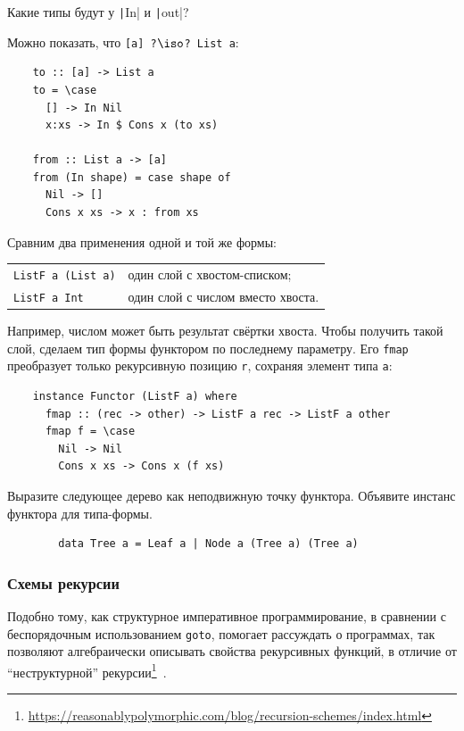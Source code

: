 \begin{task}
    Какие типы будут у \texttt|In| и \texttt|out|?
\end{task}

Можно показать, что \texttt{[a] ?$\iso$? List a}:
\begin{verbatim}
    to :: [a] -> List a
    to = \case
      [] -> In Nil
      x:xs -> In $ Cons x (to xs)

    from :: List a -> [a]
    from (In shape) = case shape of
      Nil -> []
      Cons x xs -> x : from xs
\end{verbatim}

Сравним два применения одной и той же формы:
\begin{center}
    \begin{tabular}{ll}
        \texttt{ListF a (List a)} & один слой с хвостом-списком; \\
        \texttt{ListF a Int} & один слой с числом вместо хвоста.
    \end{tabular}
\end{center}
Например, числом может быть результат свёртки хвоста.
Чтобы получить такой слой, сделаем тип формы функтором по последнему параметру.
Его \texttt{fmap} преобразует только рекурсивную позицию \texttt{r}, сохраняя элемент типа \texttt{a}:
\begin{verbatim}
    instance Functor (ListF a) where
      fmap :: (rec -> other) -> ListF a rec -> ListF a other
      fmap f = \case
        Nil -> Nil
        Cons x xs -> Cons x (f xs)
\end{verbatim}

\begin{task}
    Выразите следующее дерево как неподвижную точку функтора.
    Объявите инстанс функтора для типа-формы.
    \begin{verbatim}
        data Tree a = Leaf a | Node a (Tree a) (Tree a)
    \end{verbatim}
\end{task}

\subsubsection{Схемы рекурсии} \label{subsubsec:recursion-schemas}

Подобно тому, как структурное императивное программирование, в сравнении с беспорядочным использованием \texttt{goto}, помогает рассуждать о программах, так  позволяют алгебраически описывать свойства рекурсивных функций, в отличие от ``неструктурной'' рекурсии\footnote{\url{https://reasonablypolymorphic.com/blog/recursion-schemes/index.html}}~\cite{meijer1991functional, meijer1995bananas}.


